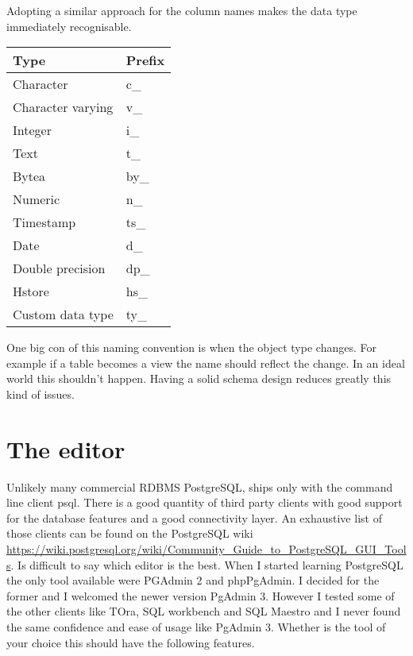 Adopting a similar approach for the column names makes the data type immediately recognisable.

\begin{table}[H]
\begin{tabular}{ll}
 \textbf{Type} & \textbf{Prefix}  \\
 \hline
 Character & c\_ \\
 Character varying & v\_ \\
Integer & i\_ \\
Text & t\_ \\
Bytea & by\_ \\
Numeric & n\_ \\
Timestamp & ts\_ \\
Date & d\_ \\
Double precision & dp\_ \\
Hstore & hs\_ \\
Custom data type & ty\_ \\

\end{tabular}
\end{table}

One big con of this naming convention is when the object type changes. For example if a table becomes a view the name 
should reflect the change. In an ideal world this shouldn't happen. Having a solid schema design reduces greatly this 
kind of issues. 


\section{The editor}
Unlikely many commercial RDBMS PostgreSQL, ships only with the command line client psql. There is a 
good quantity of third party clients with good support for the database features and a good connectivity 
layer. An exhaustive list of those clients can be found on the PostgreSQL wiki\newline
\href{https://wiki.postgresql.org/wiki/Community\_Guide\_to\_PostgreSQL\_GUI\_Tools}{
https://wiki.postgresql.org/wiki/Community\_Guide\_to\_PostgreSQL\_GUI\_Tools}. Is difficult to say 
which editor is the best. When I started learning PostgreSQL the only tool available were PGAdmin 2 and 
phpPgAdmin. I decided for the former and I welcomed the newer version PgAdmin 3. However I tested some of 
the other clients like TOra, SQL workbench and SQL Maestro and I never found the same confidence and ease 
of usage like PgAdmin 3. Whether is the tool of your choice this should have the following features.

